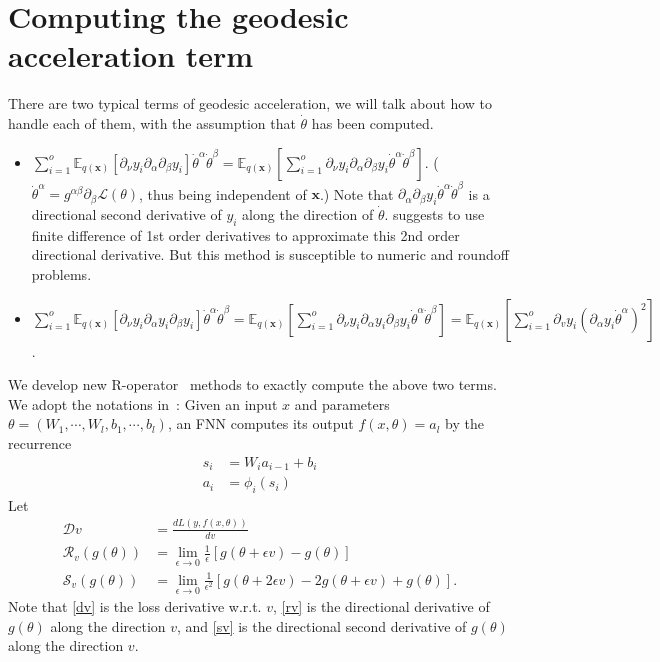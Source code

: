 \documentclass{amsart}
\theoremstyle{definition}
\theoremstyle{remark}
\numberwithin{equation}{section}
\newcommand{\cal}[1]{\mathcal{#1}}
\newcommand{\mbf}[1]{\mathbf{#1}}
\newcommand{\mbb}[1]{\mathbb{#1}}
\begin{document}
\section{Computing the geodesic acceleration term}
There are two typical terms of geodesic acceleration, we will talk about how to handle each of them, with the assumption that $\dot \theta$ has been computed.
\begin{itemize}
	\item $\sum_{i=1}^o\mbb{E}_{q(\mbf{x})}[\partial_\nu y_i \partial_\alpha\partial_\beta y_i]\dot\theta^\alpha \dot\theta^\beta = \mbb{E}_{q(\mbf{x})}[\sum_{i=1}^o \partial_\nu y_i \partial_\alpha\partial_\beta y_i \dot\theta^\alpha \dot\theta^\beta]$. ($\dot \theta^\alpha = g^{\alpha\beta}\partial_\beta\cal{L}(\theta)$, thus being independent of $\mbf{x}$.) Note that $\partial_\alpha \partial_\beta y_i \dot\theta^\alpha \dot \theta^\beta$ is a directional second derivative of $y_i$ along the direction of $\dot \theta$. \cite{GeoSethna} suggests to use finite difference of 1st order derivatives to approximate this 2nd order directional derivative. But this method is susceptible to numeric and roundoff problems.
	\item $\sum_{i=1}^o \mbb{E}_{q(\mbf{x})}[\partial_\nu y_i \partial_\alpha y_i \partial_\beta y_i]\dot\theta^\alpha \dot\theta^\beta = \mbb{E}_{q(\mbf{x})}[\sum_{i=1}^o \partial_\nu y_i \partial_\alpha y_i \partial_\beta y_i \dot \theta^\alpha \dot \theta^\beta] = \mbb{E}_{q(\mbf{x})}[\sum_{i=1}^o \partial_v y_i (\partial_\alpha y_i \dot\theta^\alpha)^2]$.
\end{itemize}
We develop new R-operator~\cite{HessianPearlmutter} methods to exactly compute the above two terms. We adopt the notations in~\cite{HFBookMartens}: Given an input $x$ and parameters $\theta = (W_1,\cdots,W_l,b_1,\cdots,b_l)$, an FNN computes its output $f(x,\theta) = a_l$ by the recurrence
\begin{align*}
	s_i &= W_i a_{i-1} + b_i\\
	a_i &= \phi_i(s_i)
\end{align*}
Let
\begin{align}
\cal{D}v &= \frac{d L(y,f(x,\theta))}{dv}\label{dv}\\
\cal{R}_v(g(\theta)) &= \lim_{\epsilon \rightarrow 0}\frac{1}{\epsilon} [g(\theta + \epsilon v) - g(\theta)]\label{rv}\\
\cal{S}_v(g(\theta)) &= \lim_{\epsilon \rightarrow 0} \frac{1}{\epsilon^2} [g(\theta + 2\epsilon v) - 2 g(\theta+\epsilon v) + g(\theta)]. \label{sv}
\end{align}
Note that \eqref{dv} is the loss derivative w.r.t. $v$, \eqref{rv} is the directional derivative of $g(\theta)$ along the direction $v$, and \eqref{sv} is the directional second derivative of $g(\theta)$ along the direction $v$.\
\end{document}
